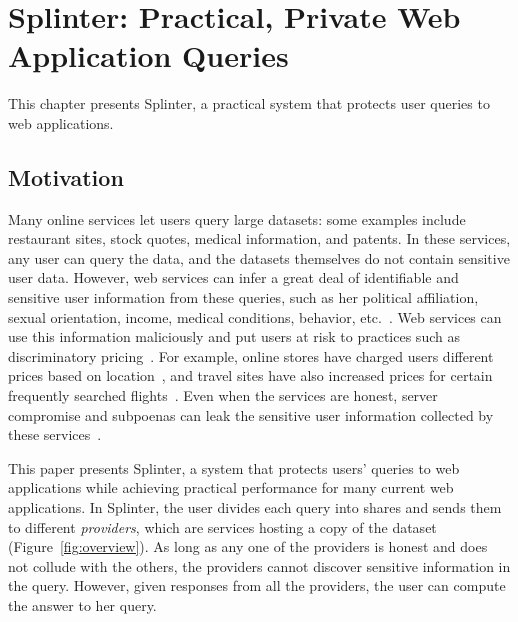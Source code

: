 \section{Splinter: Practical, Private Web Application Queries}
\label{chap:splinter}

This chapter presents Splinter, a practical system that protects user
queries to web applications.

\subsection{Motivation}
Many online services let users query large datasets:
some examples include restaurant sites, stock quotes,
medical information, and patents. In these services, 
any user can query the data, and the datasets themselves
do not contain sensitive user data. 
However, web services can infer a great deal of identifiable and sensitive
user information from these queries, such as her 
political affiliation, sexual orientation, income,
medical conditions, behavior, etc.~\cite{narayanan2010myths, narayanan2008robust}.
Web services can use this information maliciously and put users at risk to practices such as
discriminatory pricing~\cite{amazon-disc-pricing, price-disc2, hannak2014measuring}.
For example, online stores have charged users different prices based on location~\cite{price-disc}, and
travel sites have also increased prices for certain frequently searched flights~\cite{travel-pricing}.
Even when the services are honest, server compromise and subpoenas can leak the sensitive user
information collected by these services~\cite{ravichandran2009capturing, yelp-compromise, twitter-compromise}.

This paper presents Splinter, a system that protects users' queries to web applications
while achieving practical performance for many current web applications.
In Splinter, the user divides each query into shares and sends them to different
\emph{providers}, which are services hosting a copy of the dataset (Figure~\ref{fig:overview}).
As long as any one of the providers is honest and does not
collude with the others, the providers cannot discover sensitive
information in the query.
However, given responses from all the providers, the user
can compute the answer to her query.

